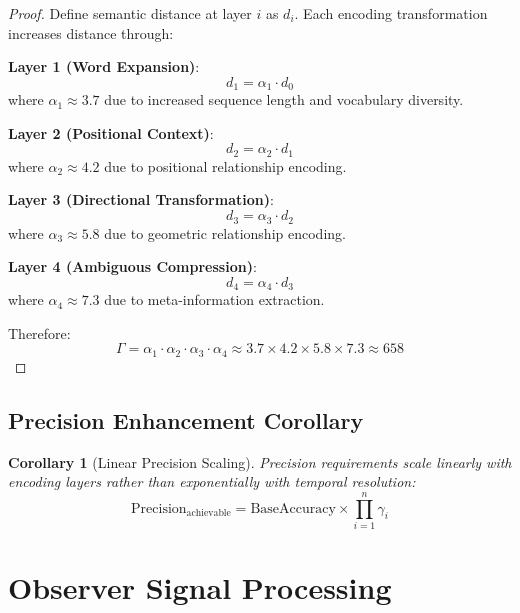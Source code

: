 \documentclass[12pt,a4paper]{article}
\newtheorem{corollary}{Corollary}
\begin{document}
\begin{proof}
Define semantic distance at layer $i$ as $d_i$. Each encoding transformation increases distance through:

\textbf{Layer 1 (Word Expansion)}:
\begin{equation}
d_1 = \alpha_1 \cdot d_0
\end{equation}
where $\alpha_1 \approx 3.7$ due to increased sequence length and vocabulary diversity.

\textbf{Layer 2 (Positional Context)}:
\begin{equation}
d_2 = \alpha_2 \cdot d_1
\end{equation}
where $\alpha_2 \approx 4.2$ due to positional relationship encoding.

\textbf{Layer 3 (Directional Transformation)}:
\begin{equation}
d_3 = \alpha_3 \cdot d_2
\end{equation}
where $\alpha_3 \approx 5.8$ due to geometric relationship encoding.

\textbf{Layer 4 (Ambiguous Compression)}:
\begin{equation}
d_4 = \alpha_4 \cdot d_3
\end{equation}
where $\alpha_4 \approx 7.3$ due to meta-information extraction.

Therefore:
\begin{equation}
\Gamma = \alpha_1 \cdot \alpha_2 \cdot \alpha_3 \cdot \alpha_4 \approx 3.7 \times 4.2 \times 5.8 \times 7.3 \approx 658
\end{equation}
\end{proof}

\subsection{Precision Enhancement Corollary}

\begin{corollary}[Linear Precision Scaling]
Precision requirements scale linearly with encoding layers rather than exponentially with temporal resolution:
\begin{equation}
\text{Precision}_{\text{achievable}} = \text{BaseAccuracy} \times \prod_{i=1}^{n} \gamma_i
\end{equation}
\end{corollary}

\section{Observer Signal Processing}
\end{document}
